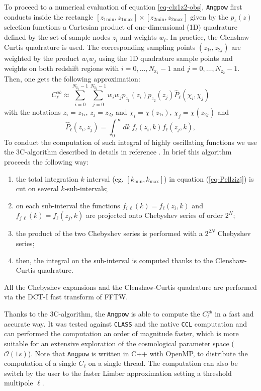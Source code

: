 \documentclass[\docopts]{\docclass}
\newcommand{\mrm}[1]{\mathrm{#1}}
\newcommand{\ccl}{{\tt CCL}\xspace}
\begin{document}
To proceed to a numerical evaluation of equation \ref{eq-clz1z2-obs}, \texttt{Angpow} first conducts  inside the rectangle $ [z_{1\mrm{min}},z_{1\mrm{max}}] \times [z_{2\mrm{min}},z_{2\mrm{max}}]$ given by the $p_z(z)$ selection functions a Cartesian product of one-dimensional (1D) quadrature
 defined by the set of sample nodes $z_i$ and weights $w_i$. In practice, the Clenshaw-Curtis quadrature is used.   The corresponding sampling points $(z_{1i},z_{2j})$ are weighted by the product  $w_i w_j$ using the 1D quadrature sample points and weights on both redshift regions with $i=0,\dots, N_{\mrm{z}_1}-1$ and $j=0,\dots,N_{\mrm{z}_2}-1$. Then, one gets the following approximation:
\begin{equation}
C_{\ell}^{ab} \approx  \sum_{i=0}^{N_{\mrm{z}_1}-1}\sum_{j=0}^{N_{\mrm{z}_2}-1} w_i w_j p_{z_1}(z_i)p_{z_2}(z_j) \widehat{P}_\ell(\chi_i,\chi_j)
\label{eq-cross-zquadra}
\end{equation}
with the notations $z_i = z_{1i}$, $z_j = z_{2j}$ and  $\chi_i = \chi(z_{1i})$, $\chi_j = \chi(z_{2j})$ and
\begin{equation}
\widehat{P}_\ell(z_i,z_j) =   \int_0^\infty dk\ f_\ell(z_i,k) f_\ell(z_j,k)
\label{eq-Pellzizj}
,\end{equation}
To conduct the computation of such integral of highly oscillating functions we use the 3C-algorithm described in details in reference \citep{2017arXiv170103592C}. In brief this algorithm proceeds the following way:
\begin{enumerate}
\item the total integration $k$ interval (eg. $[k_\mathrm{min}, k_\mathrm{max}]$) in equation (\ref{eq-Pellzizj}) is cut on several $k$-sub-intervals;
\item  on each sub-interval the functions $f_{i\, \ell}(k) = f_\ell(z_i,k) $ and $f_{j\, \ell}(k) = f_\ell(z_j,k)$ are projected onto Chebyshev series of order $2^N$;
\item the product of the two Chebyshev series is performed with a $2^{2N}$ Chebyshev series;
\item then, the integral on the sub-interval is computed thanks to the Clenshaw-Curtis quadrature.
\end{enumerate}
All the Chebyshev expansions and the Clenshaw-Curtis quadrature are performed via the DCT-I fast transform of FFTW.

Thanks to the 3C-algorithm, the \texttt{Angpow} is able to compute the $C_{\ell}^{ab}$ in a fast and accurate way. It was tested against \texttt{CLASS} and the native \ccl computation and can performed the computation an order of magnitude faster, which is more suitable for an extensive exploration of the cosmological parameter space ($\mathcal{O}(1s)$). Note that \texttt{Angpow} is written in C++ with OpenMP, to distribute the computation of a single $C_\ell$ on a single thread. The computation can also be switch by the user to the faster Limber approximation setting a threshold multipole $\ell$.
 
\end{document}
